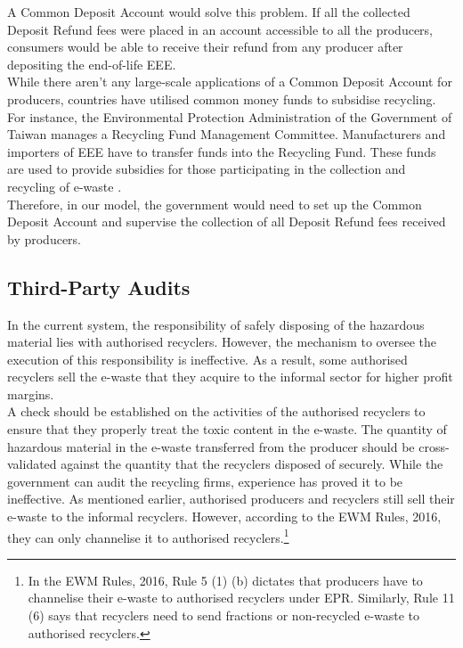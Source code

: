 \documentclass[a4paper, 12pt]{article}
\begin{document}
                    A Common Deposit Account would solve this problem. If all the collected Deposit Refund fees were placed in an account accessible to all the producers, consumers would be able to receive their refund from any producer after depositing the end-of-life EEE.\\
                    
                    While there aren’t any large-scale applications of a Common Deposit Account for producers, countries have utilised common money funds to subsidise recycling. For instance, the Environmental Protection Administration of the Government of Taiwan manages a Recycling Fund Management Committee. Manufacturers and importers of EEE have to transfer funds into the Recycling Fund. These funds are used to provide subsidies for those participating in the collection and recycling of e-waste \parencite{chungchapter}.\\
                    
                    Therefore, in our model, the government would need to set up the Common Deposit Account and supervise the collection of all Deposit Refund fees received by producers.
                    
\subsection{Third-Party Audits}
                    
                    In the current system, the responsibility of safely disposing of the hazardous material lies with authorised recyclers. However, the mechanism to oversee the execution of this responsibility is ineffective. As a result, some authorised recyclers sell the e-waste that they acquire to the informal sector for higher profit margins.\\
                    
                    A check should be established on the activities of the authorised recyclers to ensure that they properly treat the toxic content in the e-waste. The quantity of hazardous material in the e-waste transferred from the producer should be cross-validated against the quantity that the recyclers disposed of securely. While the government can audit the recycling firms, experience has proved it to be ineffective. As mentioned earlier, authorised producers and recyclers still sell their e-waste to the informal recyclers. However, according to the EWM Rules, 2016, they can only channelise it to authorised recyclers.\footnote{In the EWM Rules, 2016, Rule 5 (1) (b) dictates that producers have to channelise their e-waste to authorised recyclers under EPR. Similarly, Rule 11 (6) says that recyclers need to send fractions or non-recycled e-waste to authorised recyclers.}\\
                    
\end{document}
